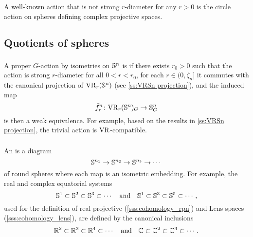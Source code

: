 A well-known action that is not strong \(r\)-diameter for any \(r>0\) is the circle action on spheres defining complex projective spaces.

\subsection{Quotients of spheres}

\subsubsection{}\label{ss:VR-compatible-Sn}


A proper \(G\)-action by isometries on \(\mathbb{S}^n\) is  if there exists \(r_0 > 0\) such that the action is strong \(r\)-diameter for all \(0 < r < r_0\), for each \(r \in (0, \zeta_n]\)  it commutes with the canonical projection of \(\mathrm{VR}_r(\mathbb{S}^n)\) (see \cref{ss:VRSn projection}), and the induced map
\[
\tilde f_r^n \colon \mathrm{VR}_r(\mathbb{S}^n)_G \to \mathbb{S}^n_G
\]
is then a weak equivalence. 
For example, based on the results in \cref{ss:VRSn projection}, the trivial action is \(\mathrm{VR}\)-compatible.

\subsubsection{}\label{subsub:VR-compatible-system}

An  is a diagram
\[
\mathbb{S}^{n_1} \to \mathbb{S}^{n_2} \to \mathbb{S}^{n_3} \to \dotsb
\]
of round spheres where each map is an isometric embedding.
For example, the real and complex equatorial systems
\[
\mathbb{S}^1 \subset \mathbb{S}^2 \subset \mathbb{S}^3 \subset \dotsb
\quad\text{and}\quad
\mathbb{S}^1 \subset \mathbb{S}^3 \subset \mathbb{S}^5 \subset \dotsb,
\]
used for the definition of real projective (\cref{sss:cohomology_rpn}) and Lens spaces (\cref{sss:cohomology_lens}), are defined by the canonical inclusions
\[
\mathbb{R}^2 \subset \mathbb{R}^3 \subset \mathbb{R}^4 \subset \dotsb
\quad\text{and}\quad
\mathbb{C} \subset \mathbb{C}^2 \subset \mathbb{C}^3 \subset \dotsb.
\]


